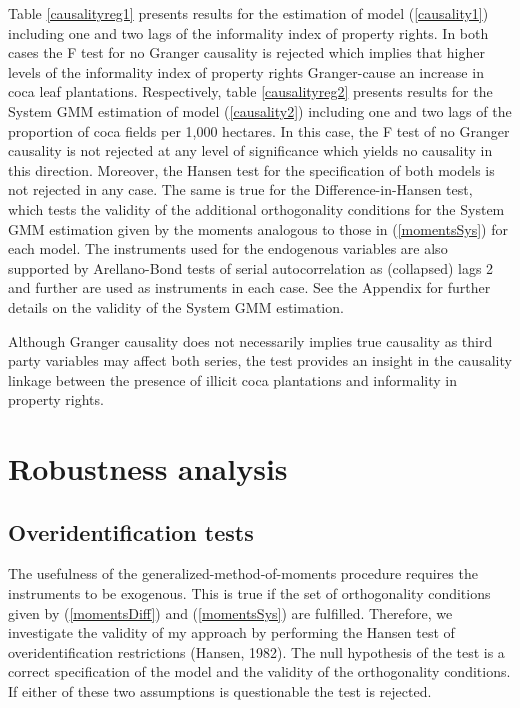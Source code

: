 Table \ref{causalityreg1} presents results for the estimation of model (\ref{causality1}) including one and two lags of the informality index of property rights. In both cases the F test for no Granger causality is rejected which implies that higher levels of the informality index of property rights Granger-cause an increase in coca leaf plantations. Respectively, table \ref{causalityreg2} presents results for the System GMM estimation of model (\ref{causality2}) including one and two lags of the proportion of coca fields per 1,000 hectares. In this case, the F test of no Granger causality is not rejected at any level of significance which yields no causality in this direction. Moreover, the Hansen test for the specification of both models is not rejected in any case. The same is true for the Difference-in-Hansen test, which tests the validity of the additional orthogonality conditions for the System GMM estimation given by the moments analogous to those in (\ref{momentsSys}) for each model. The instruments used for the endogenous variables are also supported by Arellano-Bond tests of serial autocorrelation as (collapsed) lags 2 and further are used as instruments in each case. See the Appendix for further details on the validity of the System GMM estimation.

Although Granger causality does not necessarily implies true causality as third party variables may affect both series, the test provides an insight in the causality linkage between the presence of illicit coca plantations and informality in property rights.

\section{Robustness analysis}

\subsection{Overidentification tests}
\label{overid}

The usefulness of the generalized-method-of-moments procedure requires the instruments to be exogenous. This is true if the set of orthogonality conditions given by (\ref{momentsDiff}) and (\ref{momentsSys}) are fulfilled. Therefore, we investigate the validity of my approach by performing the Hansen test of overidentification restrictions (Hansen, 1982). The null hypothesis of the test is a correct specification of the model and the validity of the orthogonality conditions. If either of these two assumptions is questionable the test is rejected.

